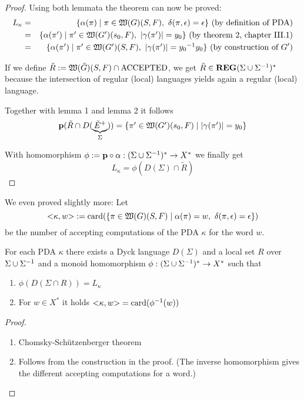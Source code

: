 \begin{proof}
Using both lemmata the theorem can now be proved:
\begin{eqnarray*}
L_\kappa &=& \setof{\alpha(\pi) \mid \pi \in \pathcat{G}(S, F),\ \delta(\pi,
\epsilon) = \epsilon}\text{ (by definition of PDA)} \\
&=& \setof{\alpha(\pi') \mid \pi' \in \pathcat{G'}(s_0, F),\ |\gamma(\pi')| =
y_0}\text{ (by theorem 2, chapter III.1)} \\
&=& \setof{\alpha(\pi') \mid \pi' \in \pathcat{G'}(S, F),\
|\gamma(\pi')| = \inv{y_0} y_0}\text{ (by construction of $G'$)}
\end{eqnarray*}

If we define $\tilde{R} := \mbox{$\mathfrak{W}({\tilde G})$}(S, F) \cap \mathrm{ACCEPTED}$, 
we get $\tilde{R} \in \mbox{{\bf REG}}(\Sigma \cup {\Sigma}^{-1})^*$ because the intersection of
regular (local) languages yields again a regular (local) language.

Together with lemma 1 and lemma 2 it follows
\[ \mathbf{p}({\tilde{R} \cap D(\underbrace{\tilde{E}^+}_{\Sigma})}) = \mbox{$\{\pi' \in
\mbox{$\mathfrak{W}({G'})$}(s_0, F) \mid |\gamma(\pi')| = y_0\}$} \]

With homomorphism $\phi := \mathbf{p} \circ \alpha : (\Sigma \cup {\Sigma}^{-1})^*
\to X^*$ we finally get
\[ L_\kappa = \phi(D(\Sigma) \cap \tilde{R}) \]
\end{proof}

We even proved slightly more: Let 
\[ {<}\kappa, w{>} := \mathrm{card}({\mbox{$\{\pi \in
\mbox{$\mathfrak{W}({G})$}(S,F) \mid \alpha(\pi) = w,\ \delta(\pi, \epsilon) = \epsilon\}$}})
\]
be the number of accepting computations of the PDA $\kappa$ for the word $w$.

\begin{corollary}
For each PDA $\kappa$ there exists a Dyck language $D(\Sigma)$ and a local set
$R$ over $\Sigma \cup {\Sigma}^{-1}$ and a monoid homomorphism $\phi:
(\Sigma \cup {\Sigma}^{-1})^* \to X^*$ such that
\begin{enumerate}
  \item $\phi(D(\Sigma\cap R)) = L_\kappa$
  \item For $w\in X^*$ it holds ${<}\kappa, w{>} = \mathrm{card}({\phi^{-1}(w)})$
\end{enumerate}
\end{corollary}

\begin{proof}\ 

\begin{enumerate}
  \item Chomsky-Schützenberger theorem
  \item Follows from the construction in the proof. (The inverse homomorphism
  gives the different accepting computations for a word.)
\end{enumerate}
\end{proof}

